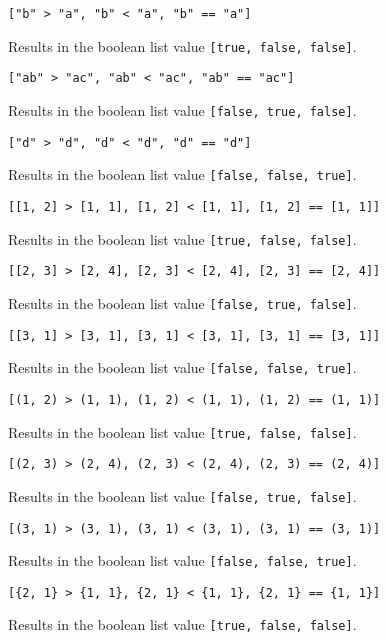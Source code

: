 {\begin{itemize}
{		\item \texttt{["b" > "a", "b" < "a", "b" == "a"]}
		
			Results in the boolean list value \texttt{[true, false, false]}.
			
		\item \texttt{["ab" > "ac", "ab" < "ac", "ab" == "ac"]}
		
			Results in the boolean list value \texttt{[false, true, false]}.
			
		\item \texttt{["d" > "d", "d" < "d", "d" == "d"]}
		
			Results in the boolean list value \texttt{[false, false, true]}.
			
		\item \texttt{[[1, 2] > [1, 1], [1, 2] < [1, 1], [1, 2] == [1, 1]]}
		
			Results in the boolean list value \texttt{[true, false, false]}.
			
		\item \texttt{[[2, 3] > [2, 4], [2, 3] < [2, 4], [2, 3] == [2, 4]]}
		
			Results in the boolean list value \texttt{[false, true, false]}.
			
		\item \texttt{[[3, 1] > [3, 1], [3, 1] < [3, 1], [3, 1] == [3, 1]]}
		
			Results in the boolean list value \texttt{[false, false, true]}.
			
		\item \texttt{[(1, 2) > (1, 1), (1, 2) < (1, 1), (1, 2) == (1, 1)]}
		
			Results in the boolean list value \texttt{[true, false, false]}.
			
		\item \texttt{[(2, 3) > (2, 4), (2, 3) < (2, 4), (2, 3) == (2, 4)]}
		
			Results in the boolean list value \texttt{[false, true, false]}.
			
		\item \texttt{[(3, 1) > (3, 1), (3, 1) < (3, 1), (3, 1) == (3, 1)]}
		
			Results in the boolean list value \texttt{[false, false, true]}.
			
		\item \texttt{[\{2, 1\} > \{1, 1\}, \{2, 1\} < \{1, 1\}, \{2, 1\} == \{1, 1\}]}
		
			Results in the boolean list value \texttt{[true, false, false]}.
			
}
\end{itemize}}
